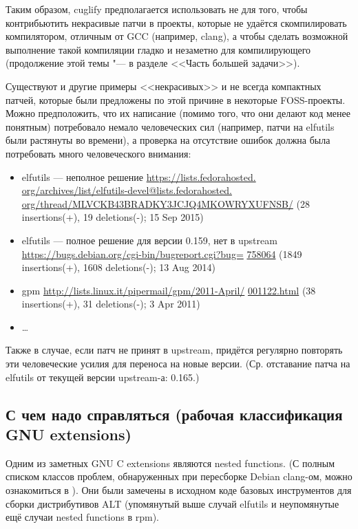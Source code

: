 \documentclass[10pt, a5paper]{article}
\begin{document}
Таким образом, cuglify предполагается использовать не для того, чтобы контрибьютить некрасивые патчи в проекты, которые не удаётся скомпилировать компилятором, отличным от GCC (например, clang), а чтобы сделать возможной выполнение такой компиляции гладко и незаметно для компилирующего (продолжение этой темы "--- в разделе <<Часть большей задачи>>).

Существуют и другие примеры <<некрасивых>> и не всегда компактных патчей, которые были предложены по этой причине в некоторые FOSS-проекты. Можно предположить, что их написание (помимо того, что они делают код менее понятным) потребовало немало человеческих сил (например, патчи на elfutils были растянуты во времени), а проверка на отсутствие ошибок должна была потребовать много человеческого внимания:

\begin{itemize}
  \item elfutils --- неполное решение \url{https://lists.fedorahosted.} \linebreak \url{org/archives/list/elfutils-devel@lists.fedorahosted.} \linebreak \url{org/thread/MLVCKB43BRADKY3JCJQ4MKOWRYXUFNSB/} \linebreak (28 insertions(+), 19 deletions(-); 15 Sep 2015)
  \item elfutils --- полное решение для версии 0.159, нет в upstream \url{https://bugs.debian.org/cgi-bin/bugreport.cgi?bug=} \linebreak \url{758064} (1849 insertions(+), 1608 deletions(-)\footnotemark[3]; 13 Aug 2014)
  \item gpm \url{http://lists.linux.it/pipermail/gpm/2011-April/} \linebreak \url{001122.html} (38 insertions(+), 31 deletions(-)\footnotemark[4]; 3 Apr 2011)
  \item \ldots{}
\end{itemize}

Также в случае, если патч не принят в upstream, придётся регулярно повторять эти человеческие усилия для переноса на новые версии. (Ср. отставание патча на elfutils от текущей версии upstream-а: 0.165.)

\subsection*{С чем надо справляться (рабочая классификация GNU extensions)}

Одним из заметных GNU C extensions являются nested functions. (С полным списком классов проблем, обнаруженных при пересборке Debian clang-ом, можно ознакомиться в \footnotemark[2]). Они были замечены в исходном коде базовых инструментов для сборки дистрибутивов ALT (упомянутый выше случай elfutils и неупомянутые ещё случаи nested functions в rpm).
\end{document}
